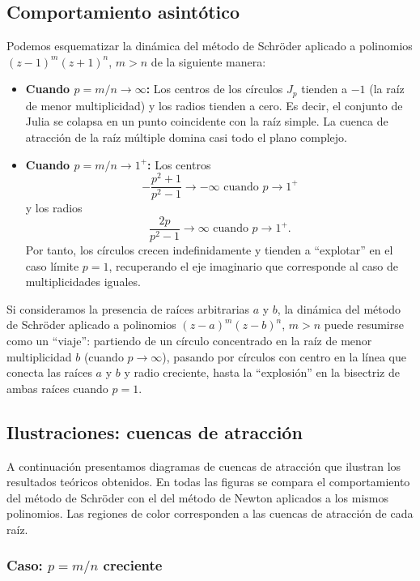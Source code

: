 \subsection{Comportamiento asintótico}

Podemos esquematizar la dinámica del método de Schröder aplicado a polinomios $(z-1)^m(z+1)^n$, $m>n$ de la siguiente manera:

\begin{itemize}
\item \textbf{Cuando $p=m/n\to \infty$:} Los centros de los círculos $J_p$ tienden a $-1$ (la raíz de menor multiplicidad) y los radios tienden a cero. Es decir, el conjunto de Julia se colapsa en un punto coincidente con la raíz simple. La cuenca de atracción de la raíz múltiple domina casi todo el plano complejo.

\item \textbf{Cuando $p=m/n\to 1^+$:} Los centros
$$
-\frac{p^2+1}{p^2-1}\to -\infty \text{ cuando } p\to 1^+
$$
y los radios
$$
\frac{2p}{p^2-1}\to \infty \text{ cuando } p\to 1^+.
$$
Por tanto, los círculos crecen indefinidamente y tienden a ``explotar'' en el caso límite $p=1$, recuperando el eje imaginario que corresponde al caso de multiplicidades iguales.
\end{itemize}

Si consideramos la presencia de raíces arbitrarias $a$ y $b$, la dinámica del método de Schröder aplicado a polinomios $(z-a)^m(z-b)^n$, $m>n$ puede resumirse como un ``viaje'': partiendo de un círculo concentrado en la raíz de menor multiplicidad $b$ (cuando $p\to\infty$), pasando por círculos con centro en la línea que conecta las raíces $a$ y $b$ y radio creciente, hasta la ``explosión'' en la bisectriz de ambas raíces cuando $p=1$.

\subsection{Ilustraciones: cuencas de atracción}

A continuación presentamos diagramas de cuencas de atracción que ilustran los resultados teóricos obtenidos. En todas las figuras se compara el comportamiento del método de Schröder con el del método de Newton aplicados a los mismos polinomios. Las regiones de color corresponden a las cuencas de atracción de cada raíz.

\subsubsection{Caso: $p=m/n$ creciente}

